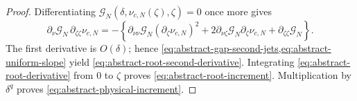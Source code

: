 \begin{proof}
Differentiating
\(\mathscr G_N(\delta,\nu_{c,N}(\zeta),\zeta)=0\) once more gives
\begin{equation*}
 \partial_\nu\mathscr G_N\,\partial_{\zeta\zeta}\nu_{c,N}
 =-\left\{
   \partial_{\nu\nu}\mathscr G_N(\partial_\zeta\nu_{c,N})^2
  +2\partial_{\nu\zeta}\mathscr G_N\partial_\zeta\nu_{c,N}
  +\partial_{\zeta\zeta}\mathscr G_N\right\}.
\end{equation*}
The first derivative is \(O(\delta)\); hence
\cref{eq:abstract-gap-second-jets,eq:abstract-uniform-slope} yield
\cref{eq:abstract-root-second-derivative}.  Integrating
\cref{eq:abstract-root-derivative} from \(0\) to \(\zeta\) proves
\cref{eq:abstract-root-increment}.  Multiplication by \(\delta^q\) proves
\cref{eq:abstract-physical-increment}.
\end{proof}

